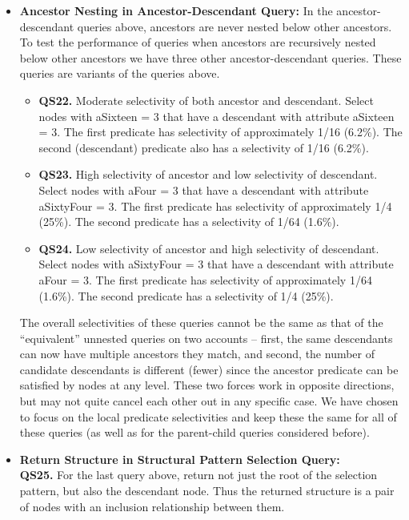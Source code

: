\begin{itemize}
\item {\bf Ancestor Nesting in Ancestor-Descendant Query:}
In the ancestor-descendant queries above, ancestors are never nested below
other ancestors.  To test the performance of queries when ancestors are
recursively nested below other ancestors we have three other
ancestor-descendant queries.  These queries are variants of the queries
above.

\begin{itemize}
\item {\bf QS22.} Moderate selectivity of both ancestor and descendant.
Select nodes with {\sf aSixteen = 3} that have a descendant with attribute {\sf
aSixteen = 3}.  The first predicate has selectivity of approximately 1/16 (6.2\%).
The second (descendant) predicate also has a selectivity of 1/16 (6.2\%).

\item {\bf QS23.} High selectivity of ancestor and low selectivity of descendant.
Select nodes with {\sf aFour = 3} that have a descendant with attribute {\sf
aSixtyFour = 3}.  The first predicate has selectivity of approximately 1/4 (25\%).
The second predicate has a selectivity of 1/64 (1.6\%).

\item {\bf QS24.} Low selectivity of ancestor and high selectivity of descendant.
Select nodes with {\sf aSixtyFour = 3} that have a descendant with attribute
{\sf aFour = 3}.  The first predicate has selectivity of approximately 1/64 (1.6\%).
The second predicate has a selectivity of 1/4 (25\%).
\end{itemize}

The overall selectivities of these queries cannot be the same as
that of the ``equivalent'' unnested queries on two accounts --
first, the same descendants can now have multiple ancestors they
match, and second, the number of candidate descendants is
different (fewer) since the ancestor predicate can be satisfied by
nodes at any level.  These two forces work in opposite directions,
but may not quite cancel each other out in any specific case.  We
have chosen to focus on the local predicate selectivities and keep
these the same for all of these queries (as well as for the
parent-child queries considered before).

\item {\bf Return Structure in Structural Pattern Selection Query:}\\
{\bf QS25.} For the last query above, return not just the root of the selection pattern,
but also the descendant node.  Thus the returned structure is a pair of nodes
with an inclusion relationship between them.


\end{itemize}
